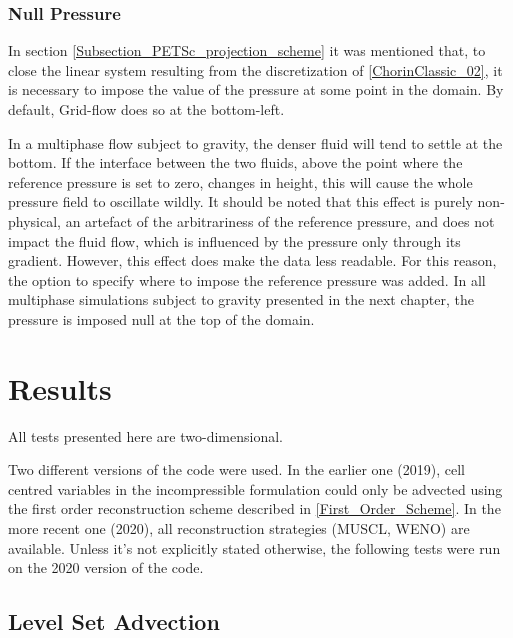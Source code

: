 \documentclass[11pt, a4paper, oneside, openany]{book}
\begin{document}
\subsection{Null Pressure}\label{Subsection_Null_Pressure}
In section \ref{Subsection_PETSc_projection_scheme} it was mentioned that, to close the linear system resulting from the discretization of \eqref{ChorinClassic_02}, it is necessary to impose the value of the pressure at some point in the domain. By default, Grid-flow does so at the bottom-left.\par
In a multiphase flow subject to gravity, the denser fluid will tend to settle at the bottom. If the interface between the two fluids, above the point where the reference pressure is set to zero, changes in height, this will cause the whole pressure field to oscillate wildly. It should be noted that this effect is purely non-physical, an artefact of the arbitrariness of the reference pressure, and does not impact the fluid flow, which is influenced by the pressure only through its gradient. However, this effect does make the data less readable. For this reason, the option to specify where to impose the reference pressure was added. In all multiphase simulations subject to gravity presented in the next chapter, the pressure is imposed null at the top of the domain.
\chapter{Results}\label{Chapter_Results}
All tests presented here are two-dimensional.\par
Two different versions of the code were used. In the earlier one (2019), cell centred variables in the incompressible formulation could only be advected using the first order reconstruction scheme described in \ref{First_Order_Scheme}. In the more recent one (2020), all reconstruction strategies (MUSCL, WENO) are available.
Unless it's not explicitly stated otherwise, the following tests were run on the 2020 version of the code. 
\section{Level Set Advection}\label{Chapter_Results_Section_Level_Set_Advection}
\end{document}
